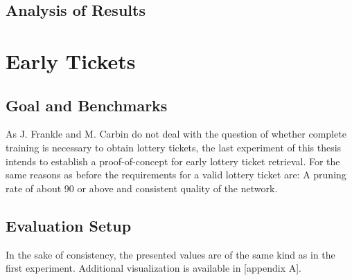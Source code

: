 \subsection*{Analysis of Results}


\section{Early Tickets}
\subsection*{Goal and Benchmarks}
As J. Frankle and M. Carbin do not deal with the question of whether complete training is necessary to obtain lottery tickets, the last experiment of this thesis intends to establish a proof-of-concept for early lottery ticket retrieval. For the same reasons as before the requirements for a valid lottery ticket are: 
A pruning rate of about 90 or above and consistent quality of the network.
\subsection*{Evaluation Setup}
In the sake of consistency, the presented values are of the same kind as in the first experiment. Additional visualization is available in [appendix A].
